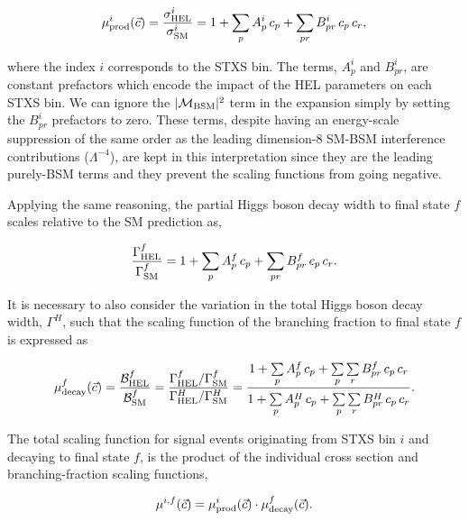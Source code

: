 \begin{equation}\label{eq:xs_scaling_functions}
    \mu^i_{\rm{prod}}(\vec{c}) = \frac{\sigma^i_{\rm{HEL}}}{\sigma^i_{\rm{SM}}} = 1 + \sum_p A^i_p\,c_p + \sum_{pr} B^i_{pr}\,c_p\,c_r,
\end{equation}

\noindent
where the index $i$ corresponds to the STXS bin. The terms, $A^i_p$ and $B^i_{pr}$, are constant prefactors which encode the impact of the HEL parameters on each STXS bin. We can ignore the $|\mathcal{M}_{\rm{BSM}}|^2$ term in the expansion simply by setting the $B^i_{pr}$ prefactors to zero. These terms, despite having an energy-scale suppression of the same order as the leading dimension-8 SM-BSM interference contributions ($\Lambda^{-4}$), are kept in this interpretation since they are the leading purely-BSM terms and they prevent the scaling functions from going negative.

Applying the same reasoning, the partial Higgs boson decay width to final state $f$ scales relative to the SM prediction as,

\begin{equation}
    \frac{\Gamma^f_{\rm{HEL}}}{\Gamma^f_{\rm{SM}}} = 1 + \sum_p A^f_p\,c_p + \sum_{pr} B^f_{pr}\,c_p\,c_r.
\end{equation}

\noindent
It is necessary to also consider the variation in the total Higgs boson decay width, $\Gamma^H$, such that the scaling function of the branching fraction to final state $f$ is expressed as

\begin{equation}
    \mu^f_{\rm{decay}}(\vec{c}) = \frac{\mathcal{B}^f_{\rm{HEL}}}{\mathcal{B}^f_{\rm{SM}}} = \frac{\Gamma^f_{\rm{HEL}}/\Gamma^f_{\rm{SM}}}{\Gamma^H_{\rm{HEL}}/\Gamma^H_{\rm{SM}}} = \frac{1 + \sum\limits_p A^f_p\,c_p + \sum\limits_p \sum\limits_r B^f_{pr}\,c_p\,c_r}{1 + \sum\limits^{~}_p A^H_p\,c_p + \sum\limits_p \sum\limits_r B^H_{pr}\,c_p\,c_r}.
\end{equation}

The total scaling function for signal events originating from STXS bin $i$ and decaying to final state $f$, is the product of the individual cross section and branching-fraction scaling functions,

\begin{equation}\label{eq:total_scaling_function}
    \mu^{i,f}(\vec{c}) = \mu^i_{\rm{prod}}(\vec{c}) \cdot \mu^f_{\rm{decay}}(\vec{c}).
\end{equation}

